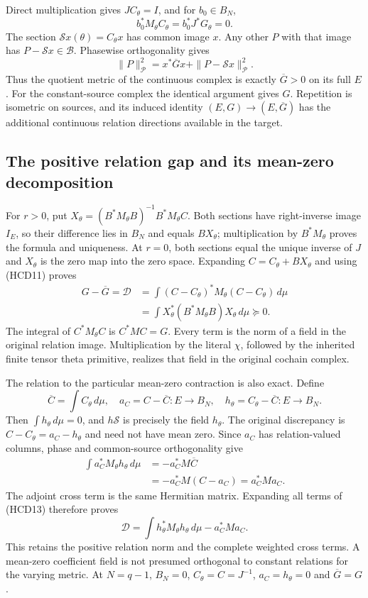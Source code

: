Direct multiplication gives $JC_\theta=I$, and for $b_0\in B_N$,
\[
 b_0^*M_\theta C_\theta=b_0^*J^*G_\theta=0.
 \tag{HCD11}
\]
The section $\mathscr Sx(\theta)=C_\theta x$ has common image
$x$. Any other $P$ with that image has
$P-\mathscr Sx\in\mathscr B$. Phasewise orthogonality gives
\[
 \|P\|_{\mathscr P}^2
 =x^*\overline Gx+\|P-\mathscr Sx\|_{\mathscr P}^2.
 \tag{HCD12}
\]
Thus the quotient metric of the continuous complex is exactly
$\overline G>0$ on its full $E$. For the constant-source
complex the identical argument gives $G$. Repetition is
isometric on sources, and its induced identity
$(E,G)\to(E,\overline G)$ has the additional continuous
relation directions available in the target.

\subsection{The positive relation gap and its mean-zero decomposition}

For $r>0$, put
$X_\theta=(B^*M_\theta B)^{-1}B^*M_\theta C$.
Both sections have right-inverse image $I_E$, so their difference
lies in $B_N$ and equals $BX_\theta$; multiplication by
$B^*M_\theta$ proves the formula and uniqueness.
At $r=0$, both sections equal the unique inverse of $J$ and
$X_\theta$ is the zero map into the zero space.
Expanding $C=C_\theta+BX_\theta$ and using (HCD11) proves
\[
 \boxed{
 \begin{aligned}
 G-\overline G=\mathscr D
 &=\int(C-C_\theta)^*M_\theta(C-C_\theta)\,d\mu\\
 &=\int X_\theta^*(B^*M_\theta B)X_\theta\,d\mu\succeq0.
 \end{aligned}}
 \tag{HCD13}
\]
The integral of $C^*M_\theta C$ is $C^*MC=G$.
Every term is the norm of a field in the original relation
image. Multiplication by the literal $\chi$, followed by
the inherited finite tensor theta primitive, realizes
that field in the original cochain complex.

The relation to the particular mean-zero contraction is also exact.
Define
\[
 \overline C=\int C_\theta\,d\mu,\quad
 a_C=C-\overline C:E\to B_N,\quad
 h_\theta=C_\theta-\overline C:E\to B_N.
 \tag{HCD14}
\]
Then $\int h_\theta\,d\mu=0$, and $h\mathscr S$ is precisely
the field $h_\theta$. The original discrepancy is
$C-C_\theta=a_C-h_\theta$ and need not have mean zero.
Since $a_C$ has relation-valued columns, phase and
common-source orthogonality give
\[
 \begin{split}
 \int a_C^*M_\theta h_\theta\,d\mu
 &=-a_C^*M\overline C\\
 &=-a_C^*M(C-a_C)=a_C^*Ma_C.
 \end{split}
 \tag{HCD15}
\]
The adjoint cross term is the same Hermitian matrix.
Expanding all terms of (HCD13) therefore proves
\[
 \boxed{\mathscr D
 =\int h_\theta^*M_\theta h_\theta\,d\mu-a_C^*Ma_C.}
 \tag{HCD16}
\]
This retains the positive relation norm and the complete
weighted cross terms. A mean-zero coefficient field is
not presumed orthogonal to constant relations for the
varying metric. At $N=q-1$, $B_N=0$,
$C_\theta=C=J^{-1}$, $a_C=h_\theta=0$ and $\overline G=G$.

